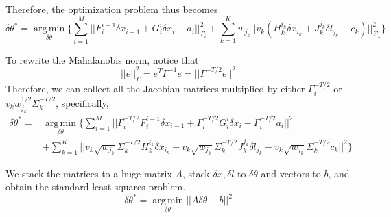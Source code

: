 Therefore, the optimization problem thus becomes
\begin{equation}
\delta \theta^* = \operatorname*{arg\,min}_{\delta \theta}\{\sum_{i=1}^M||F_i^{i-1}\delta x_{i-1} + G_i^i\delta x_i - a_i||_{\Gamma_i}^2 + \sum_{k=1}^Kw_{j_k}||v_k(H_k^{i_k}\delta x_{i_k} + J_k^{j_k}\delta l_{j_k} - c_k)||_{\Sigma_k}^2\}
\end{equation}

To rewrite the Mahalanobis norm, notice that
\begin{equation}
||e||_{\Gamma}^2 = e^T\Gamma^{-1}e = ||\Gamma^{-T/2}e||^2
\end{equation}
Therefore, we can collect all the Jacobian matrices multiplied by either $\Gamma_i^{-T/2}$ or $v_k w_{j_k}^{1/2}\Sigma_k^{-T/2}$, specifically,
\begin{equation}
\begin{aligned}
\delta \theta^* =& \operatorname*{arg\,min}_{\delta \theta}\{\sum_{i=1}^M||\Gamma_i^{-T/2}F_i^{i-1}\delta x_{i-1} + \Gamma_i^{-T/2} G_i^i\delta x_i - \Gamma_i^{-T/2}a_i||^2  \\
&+\sum_{k=1}^K||v_k\sqrt{w_{j_k}}\Sigma_k^{-T/2} H_k^{i_k}\delta x_{i_k} + v_k\sqrt{w_{j_k}}\Sigma_k^{-T/2}J_k^{j_k}\delta l_{j_k} - v_k\sqrt{w_{j_k}}\Sigma_k^{-T/2}c_k||^2\}
\end{aligned}
\end{equation}


We stack the matrices to a huge matrix $A$, stack $\delta x, \delta l$ to $\delta \theta$ and vectors to $b$, and obtain the standard least squares problem.
\begin{equation}
\delta \theta^* = \operatorname*{arg\,min}_{\delta \theta}||A\delta \theta - b||^2
\end{equation}








